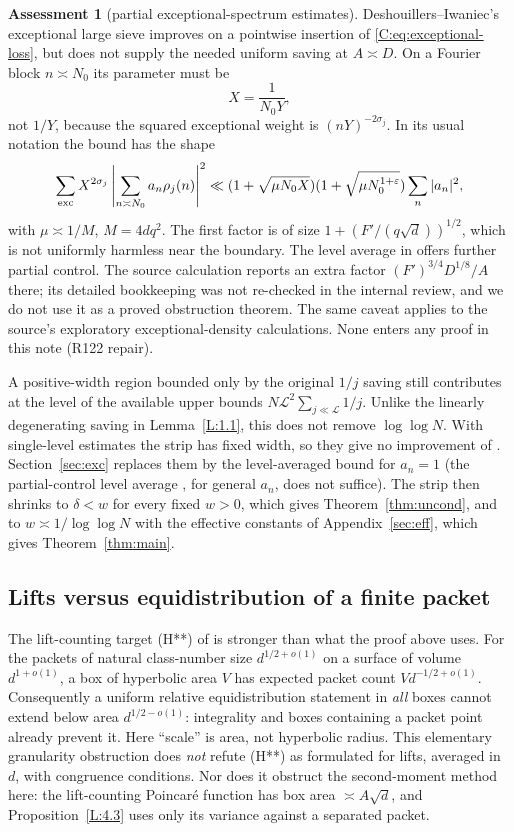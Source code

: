 \documentclass[10pt,reqno]{amsart}
\theoremstyle{definition}
\newtheorem{assessment}[theorem]{Assessment}
\numberwithin{equation}{section}
\newcommand{\cL}{\mathcal L}
\begin{document}
\begin{assessment}[partial exceptional-spectrum estimates]\label{C:ass:exceptional}
Deshouillers--Iwaniec's exceptional large sieve
\cite[Theorem~5]{DI} improves on a pointwise insertion of
\eqref{C:eq:exceptional-loss}, but does not supply the needed uniform
saving at $A\asymp D$.  On a Fourier block $n\asymp N_0$ its parameter
must be
\[
 X=\frac1{N_0Y},
\]
not $1/Y$, because the squared exceptional weight is
$(nY)^{-2\sigma_j}$.  In its usual notation the bound has the shape
\[
 \sum_{\rm exc}X^{2\sigma_j}
 \left|\sum_{n\asymp N_0}a_n\rho_j(n)\right|^2
 \ll (1+\sqrt{\mu N_0X})(1+\sqrt{\mu N_0^{1+\varepsilon}})
 \sum_n|a_n|^2,
\]
with $\mu\asymp1/M$, $M=4dq^2$.  The first factor is of size
$1+(F'/(q\sqrt d))^{1/2}$, which is not uniformly harmless near the
boundary.  The level average in \cite[Theorem~6]{DI} offers further
partial control.  The source calculation reports an extra factor
$(F')^{3/4}D^{1/8}/A$ there; its detailed bookkeeping was not re-checked
in the internal review, and we do not use it as a proved obstruction
theorem.  The same caveat applies to the source's exploratory
exceptional-density calculations.  None enters any proof in this note (R122 repair).
\end{assessment}

A positive-width region bounded only by the original $1/j$ saving
still contributes at the level of the available upper bounds
$N\cL^2\sum_{j\ll\cL}1/j$. Unlike the linearly degenerating
saving in Lemma~\ref{L:1.1}, this does not remove $\log\log N$.
With single-level estimates the strip has fixed width, so they give no
improvement of \cite[Theorem~1.1]{ET}. Section~\ref{sec:exc} replaces
them by the level-averaged bound \cite[Theorem~7]{DI} for $a_n=1$ (the
partial-control level average \cite[Theorem~6]{DI}, for general $a_n$,
does not suffice). The strip then shrinks to $\delta<w$ for every fixed
$w>0$, which gives Theorem~\ref{thm:uncond}, and to
$w\asymp1/\log\log N$ with the effective constants of Appendix~\ref{sec:eff},
which gives Theorem~\ref{thm:main}.

\subsection{Lifts versus equidistribution of a finite packet}
The lift-counting target (H**) of \cite[\S3.5]{MN3} is stronger than
what the proof above uses.  For the packets of natural class-number
size $d^{1/2+o(1)}$ on a surface of volume $d^{1+o(1)}$, a box of
hyperbolic area $V$ has expected packet count $Vd^{-1/2+o(1)}$.
Consequently a uniform relative equidistribution statement in
\emph{all} boxes cannot extend below area $d^{1/2-o(1)}$: integrality
and boxes containing a packet point already prevent it.  Here
``scale'' is area, not hyperbolic radius.  This elementary granularity
obstruction does \emph{not} refute (H**) as formulated for lifts,
averaged in $d$, with congruence conditions.  Nor does it obstruct the
second-moment method here: the lift-counting Poincar\'e function has
box area $\asymp A\sqrt d$, and Proposition~\ref{L:4.3} uses only its
variance against a separated packet.
\end{document}
